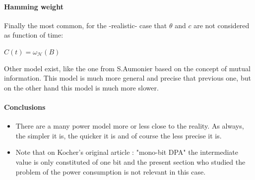 \paragraph*{Hamming weight}
Finally the most common, for the -realistic- case that $\theta $ and $c$ are not considered as function of time:
\begin{center}
$C(t) = \omega_{\mathcal{H}}(B)   $
\end{center}
Other model exist, like the one from S.Aumonier
\nocite{ecrypt-2007} \cite{ecrypt-2007-aumonier} based on the concept of mutual
information. This model is much more general and precise that previous one, 
but on the other hand this model is much more slower.



\paragraph*{Conclusions}
\begin{itemize}
\item There are a many power model more or less close to the reality.
As always, the simpler it is, the quicker it is and of course the less precise it is.
\item Note that on Kocher's original article \cite{crypto-1999-kocher}: "mono-bit DPA"
the intermediate value is only constituted of one bit and the present section who
studied the problem of the power consumption is not relevant in this case.

\end{itemize}


